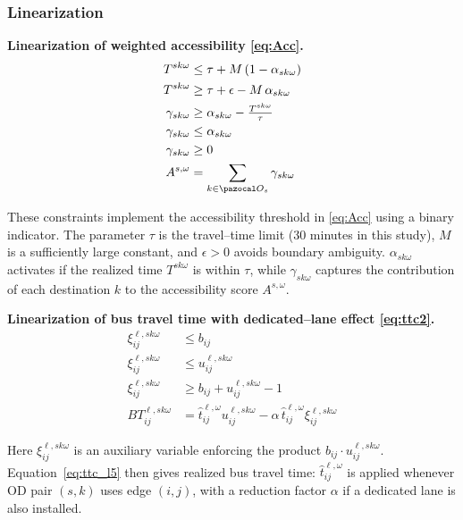 \documentclass[3p,times,procedia]{elsarticle}
\begin{document}
\subsubsection{Linearization}

\textbf{Linearization of weighted accessibility \eqref{eq:Acc}.}
\begin{align}
T^{sk\omega} &\le \tau + M\,(1 - \alpha_{sk\omega}) \label{eq:wa_l2}\\
T^{sk\omega} &\ge \tau + \epsilon - M\,\alpha_{sk\omega} \label{eq:wa_l3}\\
\gamma_{sk\omega} &\ge \alpha_{sk\omega} - \tfrac{T^{sk\omega}}{\tau} \label{eq:wa_l4}\\
\gamma_{sk\omega} &\le \alpha_{sk\omega} \label{eq:wa_l5}\\
\gamma_{sk\omega} &\ge 0 \label{eq:wa_l6}\\
A^{s,\omega} &= \sum_{k \in \pazocal O_s} \gamma_{sk\omega} \label{eq:wa_l7}
\end{align}

These constraints implement the accessibility threshold in \eqref{eq:Acc} using a binary indicator.  
The parameter $\tau$ is the travel–time limit (30 minutes in this study), $M$ is a sufficiently large constant, and $\epsilon>0$ avoids boundary ambiguity.  
$\alpha_{sk\omega}$ activates if the realized time $T^{sk\omega}$ is within $\tau$, while $\gamma_{sk\omega}$ captures the contribution of each destination $k$ to the accessibility score $A^{s,\omega}$.


\textbf{Linearization of bus travel time with dedicated–lane effect \eqref{eq:ttc2}.}
\begin{align}
\xi_{ij}^{\ell,sk\omega} &\le b_{ij} \label{eq:ttc_l2}\\
\xi_{ij}^{\ell,sk\omega} &\le u_{ij}^{\ell,sk\omega} \label{eq:ttc_l3}\\
\xi_{ij}^{\ell,sk\omega} &\ge b_{ij} + u_{ij}^{\ell,sk\omega} - 1 \label{eq:ttc_l4}\\
BT_{ij}^{\ell,sk\omega} &= \hat{t}_{ij}^{\ell,\omega} u_{ij}^{\ell,sk\omega}
- \alpha \,\hat{t}_{ij}^{\ell,\omega} \xi_{ij}^{\ell,sk\omega} \label{eq:ttc_l5}
\end{align}

Here $\xi_{ij}^{\ell,sk\omega}$ is an auxiliary variable enforcing the product $b_{ij} \cdot u_{ij}^{\ell,sk\omega}$.  
Equation~\eqref{eq:ttc_l5} then gives realized bus travel time: $\hat{t}_{ij}^{\ell,\omega}$ is applied whenever OD pair $(s,k)$ uses edge $(i,j)$, with a reduction factor $\alpha$ if a dedicated lane is also installed.
\end{document}
